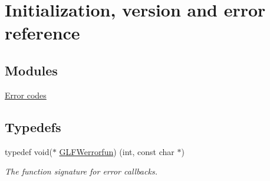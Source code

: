 \hypertarget{group__init}{}\section{Initialization, version and error reference}
\label{group__init}
\subsection*{Modules}
\begin{DoxyCompactItemize}
\item 
\hyperlink{group__errors}{Error codes}
\end{DoxyCompactItemize}
\subsection*{Typedefs}
\begin{DoxyCompactItemize}
\item 
typedef void($\ast$ \hyperlink{group__init_ga6b8a2639706d5c409fc1287e8f55e928}{G\+L\+F\+Werrorfun}) (int, const char $\ast$)
\begin{DoxyCompactList}\small\item\em The function signature for error callbacks. \end{DoxyCompactList}\end{DoxyCompactItemize}
